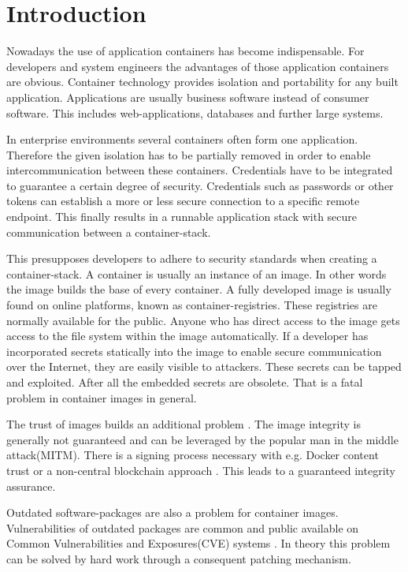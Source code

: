 \chapter{Introduction}
\label{ch:intro}

Nowadays the use of application containers has become indispensable. For developers and system engineers the advantages of those application containers are obvious. Container technology provides isolation and portability for any built application. Applications are usually business software instead of consumer software. This includes web-applications, databases and further large systems. 

In enterprise environments several containers often form one application. Therefore the given isolation has to be partially removed in order to enable intercommunication between these containers. Credentials have to be integrated to guarantee a certain degree of security. Credentials such as passwords or other tokens can establish a more or less secure connection to a specific remote endpoint. This finally results in a runnable application stack with secure communication between a container-stack.

This presupposes developers to adhere to security standards when creating a container-stack. A container is usually an instance of an image. In other words the image builds the base of every container. A fully developed image is usually found on online platforms, known as container-registries. These registries are normally available for the public. Anyone who has direct access to the image gets access to the file system within the image automatically. If a developer has incorporated secrets statically into the image to enable secure communication over the Internet, they are easily visible to attackers. These secrets can be tapped and exploited. After all the embedded secrets are obsolete. That is a fatal problem in container images in general.

The trust of images builds an additional problem \cite{to_docker_or_not}.
The image integrity is generally not guaranteed and can be leveraged by the popular man in the middle attack(MITM). There is a signing process necessary with e.g. Docker content trust or a non-central blockchain approach \cite{Xu2018}. This leads to a guaranteed integrity assurance.

Outdated software-packages are also a problem for container images. Vulnerabilities of outdated packages are common and public available on Common Vulnerabilities and Exposures(CVE) systems \cite{10.1007/978-3-319-94289-6_8}. In theory this problem can be solved by hard work through a consequent patching mechanism. 

